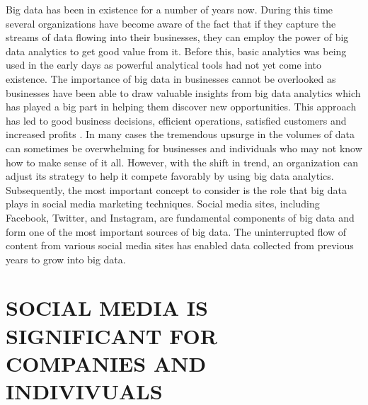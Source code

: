 \documentclass[sigconf]{acmart}
\begin{document}
Big data has been in existence for a number of years now. During this time several organizations have become aware of the fact that if they capture the streams of data flowing into their businesses, they can employ the power of big data analytics to get good value from it. Before this, basic analytics was being used in the early days as powerful analytical tools had not yet come into existence. The importance of big data in businesses cannot be overlooked as businesses have been able to draw valuable insights from big data analytics which has played a big part in helping them discover new opportunities. This approach has led to good business decisions, efficient operations, satisfied customers and increased profits \cite{Singh2016}. In many cases the tremendous upsurge in the volumes of data can sometimes be overwhelming for businesses and individuals who may not know how to make sense of it all. However, with the shift in trend, an organization can adjust its strategy to help it compete favorably by using big data analytics. Subsequently, the most important concept to consider is the role that big data plays in social media marketing techniques. Social media sites, including Facebook, Twitter, and Instagram, are fundamental components of big data and form one of the most important sources of big data. The uninterrupted flow of content from various social media sites has enabled data collected from previous years to grow into big data.

\section{SOCIAL MEDIA IS SIGNIFICANT FOR COMPANIES AND INDIVIVUALS}
\end{document}

